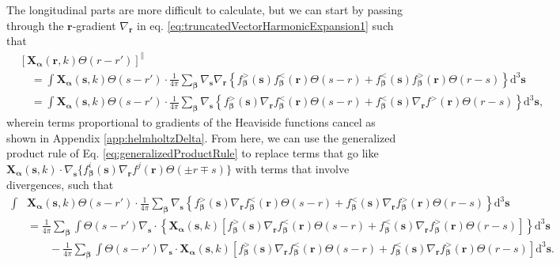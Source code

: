 \documentclass{article}
\begin{document}
The longitudinal parts are more difficult to calculate, but we can start by passing through the $\mathbf{r}$-gradient $\nabla_{\mathbf{r}}$ in eq. \eqref{eq:truncatedVectorHarmonicExpansion1} such that
\begin{equation}
\begin{split}
&\left[\mathbf{X}_{\bm{\alpha}}(\mathbf{r},k)\Theta(r - r')\right]^\parallel\\
&\quad = \int\mathbf{X}_{\bm{\alpha}}(\mathbf{s},k)\Theta(s - r')\cdot\frac{1}{4\pi}\sum_{\bm{\beta}}\nabla_{\mathbf{s}}\nabla_{\mathbf{r}}\left\{f_{\bm{\beta}}^>(\mathbf{s}) f_{\bm{\beta}}^<(\mathbf{r})\Theta(s - r) + f_{\bm{\beta}}^<(\mathbf{s})f_{\bm{\beta}}^>(\mathbf{r})\Theta(r - s)\right\}\mathrm{d}^3\mathbf{s}\\
&\quad = \int\mathbf{X}_{\bm{\alpha}}(\mathbf{s},k)\Theta(s - r')\cdot\frac{1}{4\pi}\sum_{\bm{\beta}}\nabla_{\mathbf{s}}\left\{f_{\bm{\beta}}^>(\mathbf{s})\nabla_{\mathbf{r}} f_{\bm{\beta}}^<(\mathbf{r})\Theta(s - r) + f_{\bm{\beta}}^<(\mathbf{s})\nabla_{\mathbf{r}}f^>(\mathbf{r})\Theta(r - s)\right\}\mathrm{d}^3\mathbf{s},
\end{split}
\end{equation}
wherein terms proportional to gradients of the Heaviside functions cancel as shown in Appendix \ref{app:helmholtzDelta}. From here, we can use the generalized product rule of Eq. \eqref{eq:generalizedProductRule} to replace terms that go like $\mathbf{X}_{\bm{\alpha}}(\mathbf{s},k)\cdot\nabla_{\mathbf{s}}\{f_{\bm{\beta}}^i(\mathbf{s})\nabla_{\mathbf{r}}f^j(\mathbf{r})\Theta(\pm r \mp s)\}$ with terms that involve divergences, such that
\begin{equation}
\begin{split}
\int&\mathbf{X}_{\bm{\alpha}}(\mathbf{s},k)\Theta(s - r')\cdot\frac{1}{4\pi}\sum_{\bm{\beta}}\nabla_{\mathbf{s}}\left\{f_{\bm{\beta}}^>(\mathbf{s})\nabla_{\mathbf{r}} f_{\bm{\beta}}^<(\mathbf{r})\Theta(s - r) + f_{\bm{\beta}}^<(\mathbf{s})\nabla_{\mathbf{r}}f_{\bm{\beta}}^>(\mathbf{r})\Theta(r - s)\right\}\mathrm{d}^3\mathbf{s}\\
&= \frac{1}{4\pi}\sum_{\bm{\beta}}\int\Theta(s - r')\nabla_{\mathbf{s}}\cdot\left\{\mathbf{X}_{\bm{\alpha}}(\mathbf{s},k)\left[f_{\bm{\beta}}^>(\mathbf{s})\nabla_{\mathbf{r}}f_{\bm{\beta}}^<(\mathbf{r})\Theta(s - r) + f_{\bm{\beta}}^<(\mathbf{s})\nabla_{\mathbf{r}}f_{\bm{\beta}}^>(\mathbf{r})\Theta(r - s)\right]\right\}\mathrm{d}^3\mathbf{s}\\
&\qquad- \frac{1}{4\pi}\sum_{\bm{\beta}}\int\Theta(s - r')\nabla_{\mathbf{s}}\cdot\mathbf{X}_{\bm{\alpha}}(\mathbf{s},k)\left[f_{\bm{\beta}}^>(\mathbf{s})\nabla_{\mathbf{r}}f_{\bm{\beta}}^<(\mathbf{r})\Theta(s - r) + f_{\bm{\beta}}^<(\mathbf{s})\nabla_{\mathbf{r}}f_{\bm{\beta}}^>(\mathbf{r})\Theta(r - s)\right]\mathrm{d}^3\mathbf{s}.
\end{split}
\end{equation}
\end{document}
